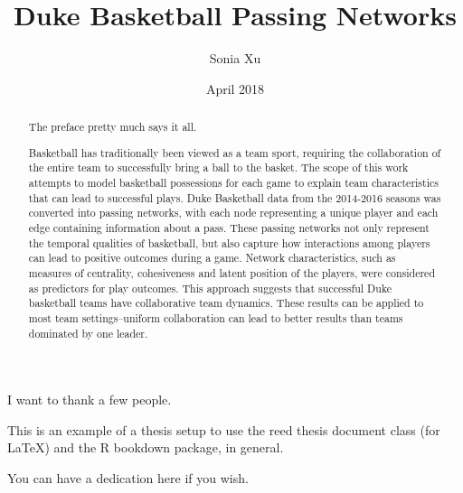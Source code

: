 \documentclass[12pt,twoside]{dukestatscithesis}
\title{Duke Basketball Passing Networks}
\author{Sonia Xu}
\date{April 2018}
\theoremstyle{definition}
\theoremstyle{definition}
\theoremstyle{definition}
\theoremstyle{remark}
\begin{document}
  \maketitle

\frontmatter %
\pagestyle{empty} %
  \begin{acknowledgements}
    I want to thank a few people.
  \end{acknowledgements}
  \begin{preface}
    This is an example of a thesis setup to use the reed thesis document
    class (for LaTeX) and the R bookdown package, in general.
  \end{preface}
  \hypersetup{linkcolor=black}
  \setcounter{tocdepth}{2}
  \tableofcontents

  \listoftables

  \listoffigures
  \begin{abstract}
    The preface pretty much says it all. \par
    
    Basketball has traditionally been viewed as a team sport, requiring the
    collaboration of the entire team to successfully bring a ball to the
    basket. The scope of this work attempts to model basketball possessions
    for each game to explain team characteristics that can lead to
    successful plays. Duke Basketball data from the 2014-2016 seasons was
    converted into passing networks, with each node representing a unique
    player and each edge containing information about a pass. These passing
    networks not only represent the temporal qualities of basketball, but
    also capture how interactions among players can lead to positive
    outcomes during a game. Network characteristics, such as measures of
    centrality, cohesiveness and latent position of the players, were
    considered as predictors for play outcomes. This approach suggests that
    successful Duke basketball teams have collaborative team dynamics. These
    results can be applied to most team settings--uniform collaboration can
    lead to better results than teams dominated by one leader.
  \end{abstract}
  \begin{dedication}
    You can have a dedication here if you wish.
  \end{dedication}
\mainmatter %
\pagestyle{fancyplain} %
\end{document}
